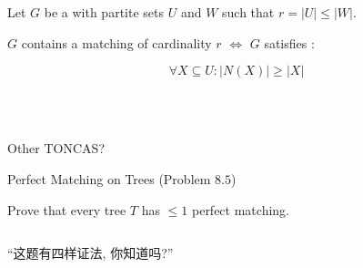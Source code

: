 
\begin{frame}{}
  \begin{theorem}
    Let $G$ be a  with partite sets $U$ and $W$ such that $r = |U| \le |W|$.

    $G$ contains a matching of cardinality $r$ $\iff$ $G$ satisfies :

    \[
      \forall X \subseteq U: \big\lvert N(X) \big\rvert \ge \big\lvert X \big\rvert
    \]
  \end{theorem}

  \pause
  \begin{center}
     \\[5pt]
     \\[8pt]
  \end{center}

  \pause
  \vspace{-0.30cm} 
  \vspace{-0.30cm} 
  \centerline{\footnotesize Other TONCAS?}
\end{frame}

\begin{frame}{}
  \begin{exampleblock}{Perfect Matching on Trees (Problem $8.5$)}
    \begin{center}
      Prove that every tree $T$ has $\le 1$ perfect matching.
    \end{center}
  \end{exampleblock}

  \pause
  \vspace{0.60cm}
  \begin{columns}
      \begin{CJK*}{UTF8}{gbsn}
	\centerline{``这题有四样证法, 你知道吗?''}
      \end{CJK*}
      \vspace{-0.30cm}
  \end{columns}
\end{frame}

